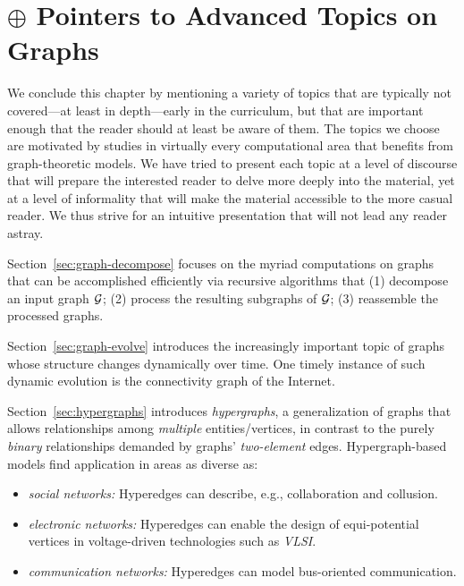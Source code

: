 
\chapter{$\oplus$ Pointers to Advanced Topics on Graphs}
\label{ch:advanced-topics}


We conclude this chapter by mentioning a variety of topics that are typically not covered---at least in depth---early in the curriculum, but that are important enough that the reader should at least be aware of them.  The topics we choose are motivated by studies in virtually every computational area that benefits from graph-theoretic models.  We have tried to present each topic at a level of discourse that will prepare the interested reader to delve more deeply into the material, yet at a level of informality that will make the material accessible to the more casual reader.  We thus strive for an intuitive presentation that will not lead any reader astray.

\medskip


Section~\ref{sec:graph-decompose} focuses on the myriad computations on graphs that can be accomplished efficiently via recursive algorithms that (1) decompose an input graph $\mbox{$\cal G$}$; (2) process the resulting subgraphs of $\mbox{$\cal G$}$; (3) reassemble the processed graphs.

\medskip

 

Section~\ref{sec:graph-evolve}  introduces the increasingly important topic of graphs whose structure changes dynamically over time.  One timely instance of such dynamic evolution is the connectivity graph of the Internet.

\medskip

   

Section~\ref{sec:hypergraphs} introduces {\it hypergraphs}, a generalization of graphs that allows relationships among {\em multiple} entities/vertices, in contrast to the purely {\em binary} relationships demanded by graphs' {\em two-element} edges.  Hypergraph-based models find application in areas as diverse as:
\begin{itemize}
\item
{\it social networks:} Hyperedges can describe, e.g., collaboration and collusion.
\item
{\it electronic networks:} Hyperedges can enable the design of equi-potential vertices in 
voltage-driven technologies such as {\it VLSI}.
\item
{\it communication networks:} Hyperedges can model bus-oriented communication.
\end{itemize}

